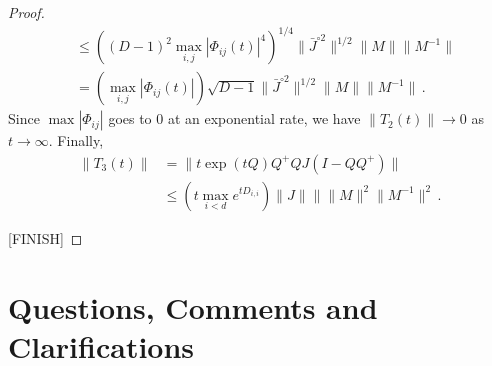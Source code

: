 \documentclass[twoside]{article}
\numberwithin{equation}{section}
\newcommand{\tr}{\mbox{Tr}}
\begin{document}
\begin{proof}
\begin{align*}
	&\leq \left( (D-1)^2 \max_{i,j} |\Phi_{ij}(t)|^4 \right)^{1/4}   \lVert \bar{J}^{\circ 2} \rVert^{1/2}   \lVert M \rVert \lVert M^{-1}  \rVert  \\
	&= \left( \max_{i,j} |\Phi_{ij}(t)| \right)\sqrt{D-1} \lVert \bar{J}^{\circ 2} \rVert^{1/2}   \lVert M \rVert \lVert M^{-1}  \rVert  \, .
\end{align*}
Since $\max |\Phi_{ij}|$ goes to 0 at an exponential rate, we have $\lVert T_2(t)\rVert \rightarrow 0$ as $t\rightarrow \infty$.  Finally,
\begin{align*}
	\lVert T_3(t) \rVert &= \lVert t \exp(tQ) Q^+ Q J( I - QQ^+)  \rVert \\
	&\leq \left(t \max_{i<d} e^{tD_{i,i}} \right) \lVert J \rVert  \rVert \lVert M \rVert^2 \lVert M^{-1} \rVert^2 \, .
\end{align*}
 


[FINISH]
\end{proof}

\section{Questions, Comments and Clarifications}
\end{document}

